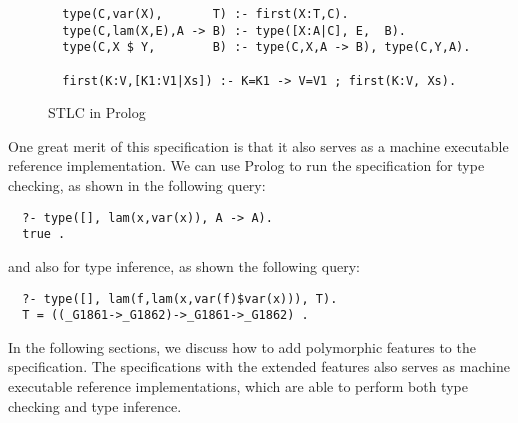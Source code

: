 \documentclass[runningheads,a4paper]{llncs}
\begin{document}
\begin{figure}
\vspace*{-1ex}
\begin{verbatim}
  type(C,var(X),       T) :- first(X:T,C).
  type(C,lam(X,E),A -> B) :- type([X:A|C], E,  B).
  type(C,X $ Y,        B) :- type(C,X,A -> B), type(C,Y,A).

  first(K:V,[K1:V1|Xs]) :- K=K1 -> V=V1 ; first(K:V, Xs).
\end{verbatim}
\vspace*{-1ex}
\caption{STLC in Prolog}
\label{fig:STLC}
\end{figure}

One great merit of this specification is that it also serves as
a machine executable reference implementation. We can use Prolog
to run the specification for type checking, as shown in the following query:
\begin{verbatim}
  ?- type([], lam(x,var(x)), A -> A).         
  true .
\end{verbatim}\noindent
and also for type inference, as shown the following query:
\begin{verbatim}
  ?- type([], lam(f,lam(x,var(f)$var(x))), T).
  T = ((_G1861->_G1862)->_G1861->_G1862) .
\end{verbatim}
In the following sections, we discuss how to add polymorphic features
to the specification. The specifications with the extended features
also serves as machine executable reference implementations, which
are able to perform both type checking and type inference.
\end{document}
